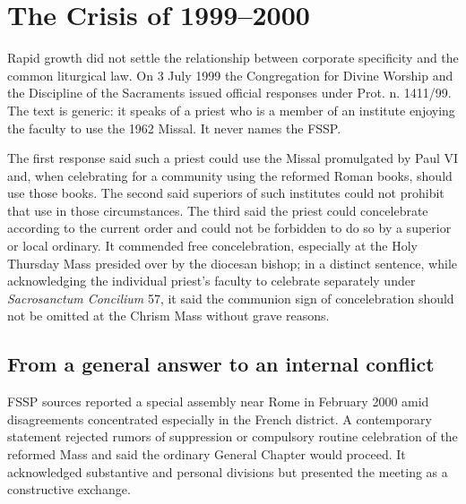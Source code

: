 \section{The Crisis of 1999--2000}

Rapid growth did not settle the relationship between corporate specificity and the common liturgical law. On 3 July 1999 the Congregation for Divine Worship and the Discipline of the Sacraments issued official responses under Prot. n. 1411/99. The text is generic: it speaks of a priest who is a member of an institute enjoying the faculty to use the 1962 Missal. It never names the FSSP.

The first response said such a priest could use the Missal promulgated by Paul VI and, when celebrating for a community using the reformed Roman books, should use those books. The second said superiors of such institutes could not prohibit that use in those circumstances. The third said the priest could concelebrate according to the current order and could not be forbidden to do so by a superior or local ordinary. It commended free concelebration, especially at the Holy Thursday Mass presided over by the diocesan bishop; in a distinct sentence, while acknowledging the individual priest's faculty to celebrate separately under \emph{Sacrosanctum Concilium} 57, it said the communion sign of concelebration should not be omitted at the Chrism Mass without grave reasons.


\subsection{From a general answer to an internal conflict}

FSSP sources reported a special assembly near Rome in February 2000 amid disagreements concentrated especially in the French district. A contemporary statement rejected rumors of suppression or compulsory routine celebration of the reformed Mass and said the ordinary General Chapter would proceed. It acknowledged substantive and personal divisions but presented the meeting as a constructive exchange.

